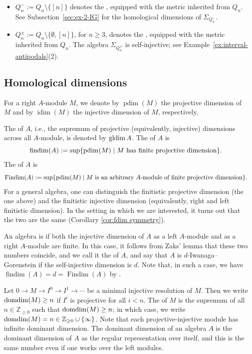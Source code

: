 \documentclass[a4paper,leqno]{amsart}
\begin{document}
\begin{itemize}
    \item $Q_n^-:=Q_n\setminus\{[n]\}$ denotes the
    , equipped with
    the metric inherited from $Q_n$.
    See Subsection~\ref{sec:ex-2-IG} for the homological
    dimensions of $\Sigma_{Q_n^-}$.

    \item $Q_n^\pm:=Q_n\setminus\{\emptyset,[n]\}$, for $n\geq3$,
    denotes the ,
    equipped with the metric inherited from $Q_n$.
    The algebra $\Sigma_{Q_n^\pm}$ is self-injective; see
    Example~\ref{ex:interval-antipodals}(2).
\end{itemize}

\subsection{Homological dimensions}\label{subsec:def-homo-dim}

For a right $A$-module $M$, we denote by $\operatorname{pdim}(M)$ the projective dimension of $M$ and by $\operatorname{idim}(M)$ the injective dimension of $M$, respectively.

The  of $A$, i.e., the supremum of projective (equivalently, injective) dimensions across all $A$-module, is denoted by $\operatorname{gldim} A$.
The  of $A$ is 
\[
\operatorname{findim}(A):=\sup \{ \operatorname{pdim}(M) \mid M \text{ has finite projective dimension} \}.
\]
The  of \(A\) is
$$\operatorname{Findim}(A)
:=\sup\{\operatorname{pdim}(M)\mid M \text{ is an arbitrary \(A\)-module of finite projective dimension}\}.$$
For a general algebra, one can distinguish the  finitistic projective dimension (the one above) and the finitistic injective dimension (equivalently, right and left finitistic dimension).  In the setting in which we are interested, it turns out that the two are the same (Corollary \ref{cor:fdim symmetry}).

An algebra is  if both the injective dimension of $A$ as a left $A$-module and as a right $A$-module are finite.  In this case, it follows from Zaks' lemma that these two numbers coincide, and we call it the  of $A$, and say that $A$ is $d$-Iwanaga--Gorenstein if the self-injective dimension is $d$.  Note that, in such a case, we have
$\operatorname{findim}(A)
=d=
\operatorname{Findim}(A)$
by \cite[Theorem~3.2]{AHHT}.

Let $0\to M\to I^0 \to I^1 \to \cdots$ be a minimal injective resolution of $M$.  Then we write $\operatorname{domdim}(M)\ge n$ if $I^i$ is projective for all $i<n$.  The  of $M$ is the supremum of all $n\in\mathbb{Z}_{\ge 0}$ such that $\operatorname{domdim}(M)\ge n$; in which case, we write $\operatorname{domdim}(M)=n\in \mathbb{Z}_{\ge 0}\cup \{\infty\}$.  Note that each projective-injective module has infinite dominant dimension.
The dominant dimension of an algebra $A$ is the dominant dimension of $A$ as the regular representation over itself, and this is the same number even if one works over the left modules.
\end{document}
